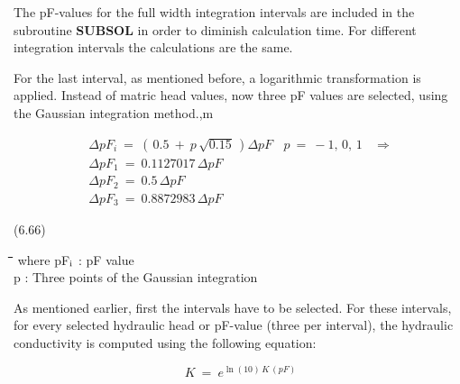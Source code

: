\documentclass[11pt]{article}
\begin{document}
\bigskip
The pF-values for the full width integration intervals are included in the subroutine
{\bf SUBSOL} in order to diminish calculation time. For different integration intervals the
calculations are the same. 

\bigskip
For the last interval, as mentioned before, a logarithmic transformation is applied. Instead
of matric head values, now three pF values are selected, using the Gaussian integration
method.,m

\begin{eqnarray*}
\Delta pF _{i} ~=~ (\, 0.5 ~+~ p\, \sqrt{0.15} \, )\Delta pF ~~~~ p~=~ -1,\, 0,\, 1~~~~ \Rightarrow   \nonumber  \\
\Delta pF _{1} ~=~ 0.1127017\,\Delta pF  \nonumber  \\
\Delta pF _{2} ~=~ 0.5\,\Delta pF  \nonumber  \\
\Delta pF _{3} ~=~ 0.8872983\,\Delta pF
\end{eqnarray*}

 \bigskip
\strut\hfill (6.66)

\bigskip
\bigskip
\bigskip
\nwln
\begin{tabbing}
\hspace{1.27cm}\=\hspace{1.27cm}\=\hspace{1.27cm}\=\hspace{1.27cm}\=%
\hspace{1.27cm}\=\hspace{1.27cm}\=\hspace{1.27cm}\=\hspace{1.27cm}\=%
\hspace{1.27cm}\=\hspace{1.27cm}\=\kill
where\> pF$_{{\rm i}}$\> : pF value\> \> \> \> \> \> \> \> [-]\\
\>p\> : Three points of the Gaussian integration
\end{tabbing}

\bigskip
As mentioned earlier, first the intervals have to be selected. For these intervals, for every
selected hydraulic head or pF-value (three per interval), the hydraulic conductivity is
computed using the following equation:

\begin{displaymath}
K~=~e ^{\ln (10)\, K\, (pF)} 
\end{displaymath}
\end{document}
